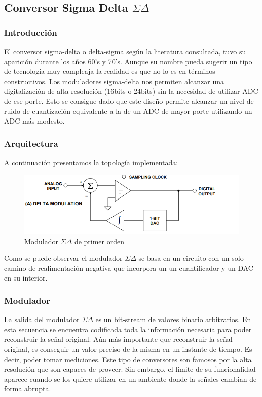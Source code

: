 



\subsection{Conversor Sigma Delta $\Sigma \Delta$}

\subsubsection{Introducción}
El conversor sigma-delta o delta-sigma según la literatura consultada, tuvo su aparición durante los años 60's y 70's. Aunque su nombre pueda sugerir un tipo de tecnología muy compleaja la realidad es que no lo es en términos constructivos. Los moduladores sigma-delta nos permiten alcanzar una digitalización de alta resolución (16bits o 24bits) sin la necesidad de utilizar ADC de ese porte. Esto se consigue dado que este diseño permite alcanzar un nivel de ruido de cuantización equivalente a la de un ADC de mayor porte utilizando un ADC más modesto.


\subsubsection{Arquitectura}

A continuación presentamos la topología implementada:

\begin{figure}[H]
	\centering
	\includegraphics[width=0.7\linewidth]{ImagenesEjercicio2/diagramaEnBloques}
	\caption{Modulador $\Sigma\Delta$ de primer orden}
	\label{fig:diagramaenbloques}
\end{figure}

Como se puede observar el modulador $\Sigma\Delta$ se basa en un circuito con un solo camino de realimentación negativa que incorpora un un cuantificador y un DAC en su interior.



\subsubsection{Modulador}
La salida del modulador $\Sigma\Delta$ es un bit-stream de valores binario arbitrarios. En esta secuencia se encuentra codificada toda la información necesaria para poder reconstruir la señal original. Aún más importante que reconstruir la señal original, es conseguir un valor preciso de la misma en un instante de tiempo. Es decir, poder tomar mediciones. Este tipo de conversores son famosos por la alta resolución que son capaces de proveer. Sin embargo, el limite de su funcionalidad aparece cuando se los quiere utilizar en un ambiente donde la señales cambian de forma abrupta.

